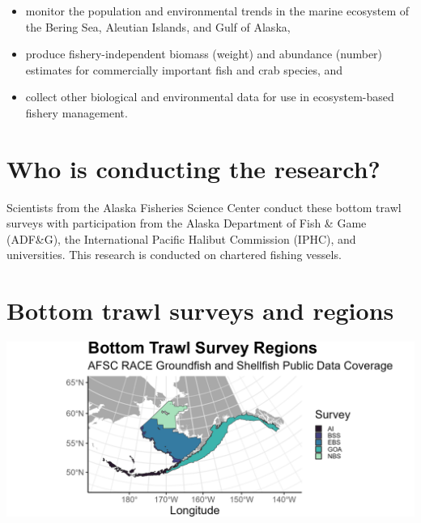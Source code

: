 \documentclass[
  letterpaper,
  oneside,
  open=any]{scrbook}
\providecommand{\tightlist}{%
  \setlength{\itemsep}{0pt}\setlength{\parskip}{0pt}}\usepackage{longtable,booktabs,array}
\begin{document}
\begin{itemize}
\tightlist
\item
  monitor the population and environmental trends in the marine
  ecosystem of the Bering Sea, Aleutian Islands, and Gulf of Alaska,
\item
  produce fishery-independent biomass (weight) and abundance (number)
  estimates for commercially important fish and crab species, and
\item
  collect other biological and environmental data for use in
  ecosystem-based fishery management.
\end{itemize}

\hypertarget{who-is-conducting-the-research-1}{%
\section{Who is conducting the
research?}\label{who-is-conducting-the-research-1}}

Scientists from the Alaska Fisheries Science Center conduct these bottom
trawl surveys with participation from the Alaska Department of Fish \&
Game (ADF\&G), the International Pacific Halibut Commission (IPHC), and
universities. This research is conducted on chartered fishing vessels.

\hypertarget{bottom-trawl-surveys-and-regions}{%
\section{Bottom trawl surveys and
regions}\label{bottom-trawl-surveys-and-regions}}

\includegraphics[width=7in,height=\textheight]{content/../img/survey_plot.png}
\end{document}
